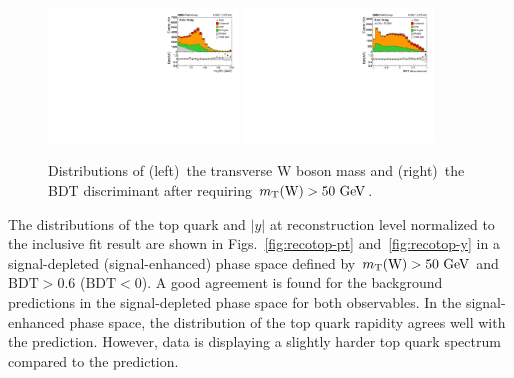 \documentclass[12pt]{article}
\begin{document}
\begin{figure}[th]
\begin{center}
\includegraphics[width=0.45\textwidth]{figures/fit/reco_mtw.pdf}\hspace{0.05\textwidth}
\includegraphics[width=0.45\textwidth]{figures/fit/reco_BDT.pdf}
\end{center}

\caption{\label{fig:mtwbdt}Distributions of (left)~the transverse W boson mass and (right)~the BDT discriminant after requiring $m_{\mathrm{T}}(\mathrm{W})>50~\mathrm{GeV}$.}
\end{figure}

The distributions of the top quark \pt and $|y|$ at reconstruction level normalized to the inclusive fit result are shown in Figs.~\ref{fig:recotop-pt} and~\ref{fig:recotop-y} in a signal-depleted (signal-enhanced) phase space defined by $m_{\mathrm{T}}(\mathrm{W})>50~\mathrm{GeV}$ and $\mathrm{BDT}>0.6$ ($\mathrm{BDT}<0$). A good agreement is found for the background predictions in the signal-depleted phase space for both observables. In the signal-enhanced phase space, the distribution of the top quark rapidity agrees well with the prediction. However, data is displaying a slightly harder top quark \pt spectrum compared to the prediction.
\end{document}
